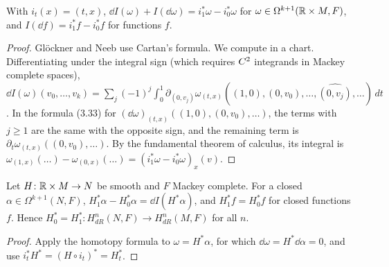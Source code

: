 \begin{theorem}
  \label{thm:homotopy-formula}
  \leanok
  With $i_t(x) = (t, x)$, $\dd I(\omega) + I(\dd\omega) = i_1^*\omega - i_0^*\omega$ for
  $\omega \in \Omega^{k+1}(\mathbb{R} \times M, F)$, and $I(\dd f) = i_1^* f - i_0^* f$ for functions $f$.
\end{theorem}

\begin{proof}
  \leanok
  Glöckner and Neeb use Cartan's formula. We compute in a chart. Differentiating under the
  integral sign (which requires $C^{2}$ integrands in Mackey complete spaces),
  $\dd I(\omega)(v_0, \dots, v_k) = \sum_j (-1)^j \int_0^1 \partial_{(0, v_j)}
  \omega_{(t,x)}((1,0), (0, v_0), \dots, \widehat{(0, v_j)}, \dots)\, dt$. In the formula (3.33)
  for $(\dd\omega)_{(t,x)}((1, 0), (0, v_0), \dots)$, the terms with $j \geq 1$ are the same with
  the opposite sign, and the remaining term is $\partial_t \omega_{(t,x)}((0, v_0), \dots)$. By the
  fundamental theorem of calculus, its integral is $\omega_{(1, x)}(\dots) - \omega_{(0,
  x)}(\dots) = (i_1^*\omega - i_0^*\omega)_x(v)$.
\end{proof}

\begin{theorem}
  \label{thm:homotopy-lemma}
  \leanok
  Let $H \colon \mathbb{R} \times M \to N$ be smooth and $F$ Mackey complete. For a closed $\alpha \in
  \Omega^{k+1}(N, F)$, $H_1^*\alpha - H_0^*\alpha = \dd I(H^*\alpha)$, and $H_1^* f = H_0^* f$ for
  closed functions $f$. Hence $H_0^* = H_1^* \colon H^n_{dR}(N, F) \to H^n_{dR}(M, F)$ for all $n$.
\end{theorem}

\begin{proof}
  \leanok
  Apply the homotopy formula to $\omega = H^*\alpha$, for which $\dd\omega = H^*\dd\alpha = 0$, and
  use $i_t^* H^* = (H \circ i_t)^* = H_t^*$.
\end{proof}

